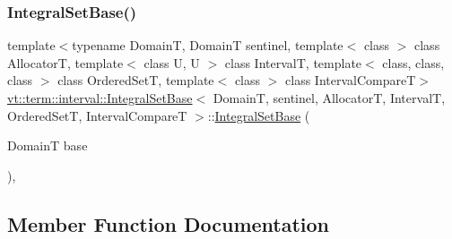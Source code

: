 \mbox{\label{structvt_1_1term_1_1interval_1_1_integral_set_base_a1e162190ce569f5479d29c2284419980}} 
\subsubsection{\texorpdfstring{Integral\+Set\+Base()}{IntegralSetBase()}\hspace{0.1cm}{\footnotesize\ttfamily [4/4]}}
{\footnotesize\ttfamily template$<$typename DomainT, DomainT sentinel, template$<$ class $>$ class AllocatorT, template$<$ class U, U $>$ class IntervalT, template$<$ class, class, class $>$ class Ordered\+SetT, template$<$ class $>$ class Interval\+CompareT$>$ \\
\hyperlink{structvt_1_1term_1_1interval_1_1_integral_set_base}{vt\+::term\+::interval\+::\+Integral\+Set\+Base}$<$ DomainT, sentinel, AllocatorT, IntervalT, Ordered\+SetT, Interval\+CompareT $>$\+::\hyperlink{structvt_1_1term_1_1interval_1_1_integral_set_base}{Integral\+Set\+Base} (\begin{DoxyParamCaption}\item[{DomainT}]{base }\end{DoxyParamCaption})\hspace{0.3cm}{\ttfamily [inline]}, {\ttfamily [explicit]}}



\subsection{Member Function Documentation}
\mbox{\label{structvt_1_1term_1_1interval_1_1_integral_set_base_a23d95f362bdc1094ae5f7f293771465a}} 
